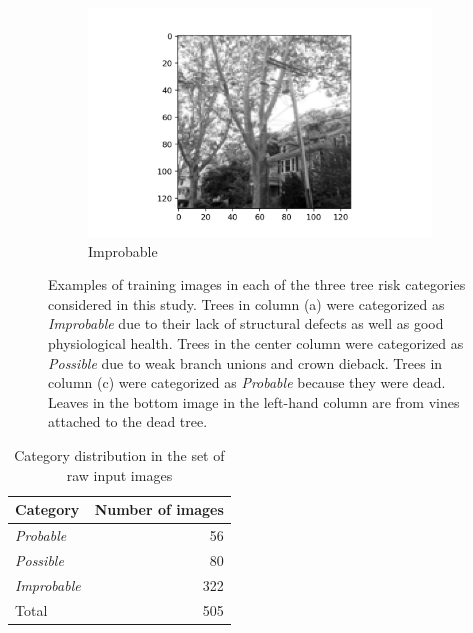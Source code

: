 \documentclass[Journal, letterpaper, DoubleSpace, InsideFigs]{ascelike-new}
\begin{document}
\begin{figure}[ht]
\begin{subfigure}[t]{.325\linewidth}
    \includegraphics[width=\textwidth,keepaspectratio=true,angle=-90]{improbable-example-2}
    \caption{Improbable}
  \end{subfigure}
  \caption{Examples of training images in each of the three tree risk categories considered in this study.  Trees in  
     column (a) were categorized as \textit{Improbable} due to their lack of structural defects as well as good
    physiological health. Trees in the center column were categorized as \textit{Possible} due to weak branch unions and crown
    dieback. Trees in column (c)  were categorized as \textit{Probable} because they were dead. Leaves in the bottom
    image in the left-hand column are from vines attached to the dead tree.}
  \label{fig:raw_images}
\end{figure}

\begin{table}[h!]\small
    \centering
    \begin{tabular}{l r}\toprule
    \bf Category     & \bf Number of images  \\ \midrule
    \textit{Probable} & 56 \\
      \textit{Possible} & 80 \\
      \textit{Improbable} & 322\\\midrule
    Total & 505 \\\bottomrule
    \end{tabular}
    \caption{Category distribution  in the set of raw input images}
    \label{tab:classdist}
\end{table}
\end{document}
